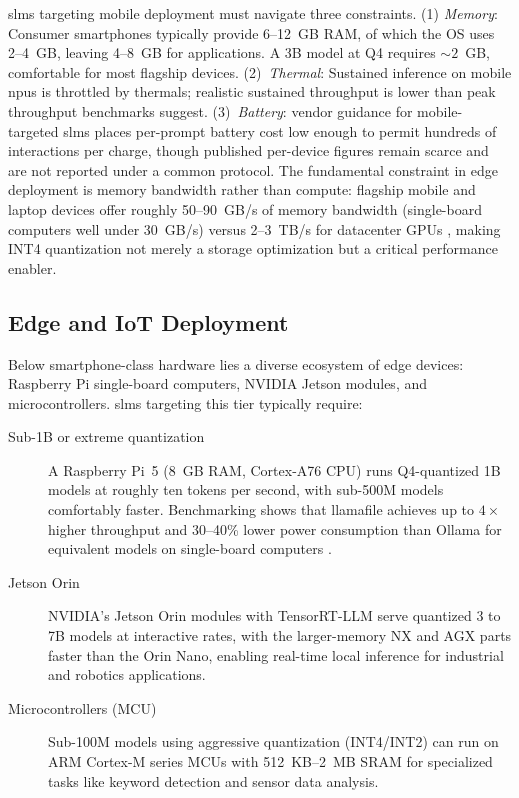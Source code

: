 \glspl{slm} targeting mobile deployment must navigate three constraints. (1) \emph{Memory}: Consumer smartphones typically provide 6--12~GB RAM, of which the OS uses 2--4~GB, leaving 4--8~GB for applications. A 3B model at Q4 requires ${\sim}2$~GB, comfortable for most flagship devices. (2)~\emph{Thermal}: Sustained inference on mobile \glspl{npu} is throttled by thermals; realistic sustained throughput is lower than peak throughput benchmarks suggest. (3)~\emph{Battery}: vendor guidance for mobile-targeted \glspl{slm} places per-prompt battery cost low enough to permit hundreds of interactions per charge, though published per-device figures remain scarce and are not reported under a common protocol. The fundamental constraint in edge deployment is memory bandwidth rather than compute: flagship mobile and laptop devices offer roughly 50--90~GB/s of memory bandwidth (single-board computers well under 30~GB/s) versus 2--3~TB/s for datacenter GPUs \citep{xu2024device}, making INT4 quantization not merely a storage optimization but a critical performance enabler.

\subsection{Edge and IoT Deployment}
\label{subsec:deployment_edge}

Below smartphone-class hardware lies a diverse ecosystem of edge devices: Raspberry Pi single-board computers, NVIDIA Jetson modules, and microcontrollers. \glspl{slm} targeting this tier typically require:

\begin{description}
    \item[Sub-1B or extreme quantization] A Raspberry Pi~5 (8~GB RAM, Cortex-A76 CPU) runs Q4-quantized 1B models at roughly ten tokens per second, with sub-500M models comfortably faster. Benchmarking shows that llamafile achieves up to $4\times$ higher throughput and 30--40\% lower power consumption than Ollama for equivalent models on single-board computers \citep{costa2025sbc}.

    \item[Jetson Orin] NVIDIA's Jetson Orin modules with TensorRT-LLM \citep{nvidia_tensorrt2024} serve quantized 3 to 7B models at interactive rates, with the larger-memory NX and AGX parts faster than the Orin Nano, enabling real-time local inference for industrial and robotics applications.

    \item[Microcontrollers (MCU)] Sub-100M models using aggressive quantization (INT4/INT2) can run on ARM Cortex-M series MCUs with 512~KB--2~MB SRAM for specialized tasks like keyword detection and sensor data analysis.
\end{description}

